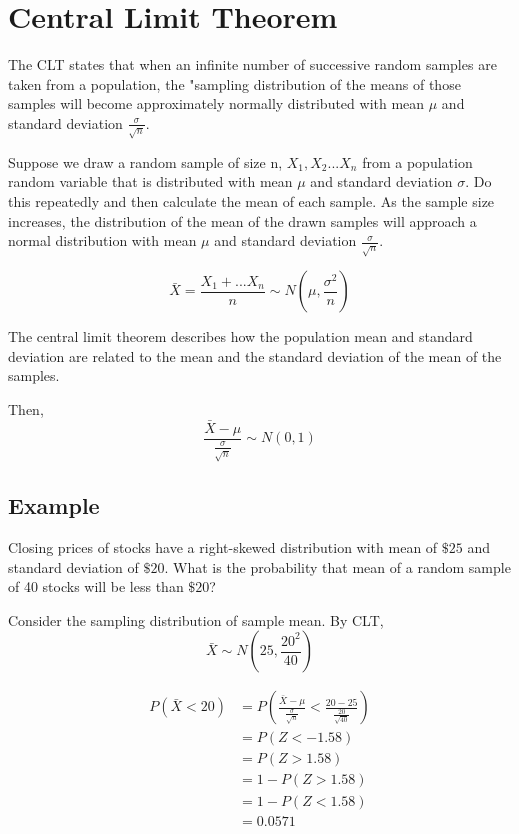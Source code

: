 \documentclass{article}
\begin{document}
    \section*{Central Limit Theorem}
    The CLT states that when an infinite number of successive random samples are taken from a population, the "sampling 
    distribution of the means of those samples will become approximately normally distributed with mean $\mu$ and 
    standard deviation $\frac{\sigma}{\sqrt{n}}$.

    Suppose we draw a random sample of size n, $X_{1}, X_{2}...X_{n}$ from a population random variable that is distributed
    with mean $\mu$ and standard deviation $\sigma$. Do this repeatedly and then calculate the mean of each sample. As the sample size
    increases, the distribution of the mean of the drawn samples will approach a normal distribution with mean $\mu$ and standard deviation $\frac{\sigma}{\sqrt{n}}$.

    \begin{equation*}
        \bar{X} = \frac{X_{1}+...X_{n}}{n} \sim N(\mu, \frac{\sigma^{2}}{n})
    \end{equation*}

    The central limit theorem describes how the population mean and standard deviation 
    are related to the mean and the standard deviation of the mean of the samples.

    Then,
    \begin{equation*}
        \frac{\bar{X}-\mu}{\frac{\sigma}{\sqrt{n}}} \sim N(0, 1)
    \end{equation*}

    \subsection*{Example}
    Closing prices of stocks have a right-skewed distribution with mean of $\$25$ and standard deviation of $\$20$.
    What is the probability that mean of a random sample of 40 stocks will be less than $\$20$?

    Consider the sampling distribution of sample mean. By CLT, 
    \begin{equation*}
        \bar{X} \sim N(25, \frac{20^{2}}{40})
    \end{equation*}

    \begin{align*}
        P(\bar{X} < 20) &= P(\frac{\bar{X} - \mu}{ \frac{\sigma}{\sqrt{n}}} < \frac{20-25}{\frac{20}{\sqrt{40}}})\\
        &= P(Z<-1.58)\\
        &= P(Z>1.58)\\
        &= 1-P(Z>1.58)\\
        &= 1-P(Z<1.58)\\
        &= \boxed{0.0571}
    \end{align*}
\end{document}
